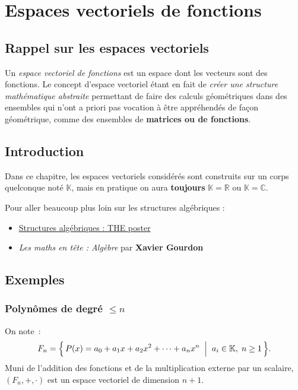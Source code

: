 \chapter{Espaces vectoriels de fonctions} \label{chap:evf}

\section{Rappel sur les espaces vectoriels}
Un \emph{espace vectoriel de fonctions} est un espace dont les
vecteurs sont des fonctions. Le concept d'espace vectoriel étant en
fait de \emph{créer une structure mathématique abstraite} permettant de
faire des calculs géométriques dans des ensembles qui n'ont a priori
pas vocation à être appréhendés de façon géométrique, comme des
ensembles de \textbf{matrices ou de fonctions}.

\section{Introduction}
Dans ce chapitre, les espaces vectoriels considérés sont construits
sur un corps quelconque not\'e $\mathbb{K}$, mais en pratique on aura
\textbf{toujours} $\mathbb{K}=\mathbb{R}$ ou $\mathbb{K}=\mathbb{C}$.

\begin{Note}
	Pour aller beaucoup plus loin sur les structures alg\'ebriques :
	\begin{itemize}
		\item \href{https://rancune.org/sciences/2022/03/23/structures-algebriques.html}{Structures algébriques : THE poster}
		\item \emph{Les maths en tête : Algèbre} par \textbf{Xavier Gourdon}\Cite{Gourdon2009}
	\end{itemize}
\end{Note}

\section{Exemples}

\subsection{Polynômes de degré $\leq n$}
On note~:
\[
  F_n = \Bigl\{\, P(x) = a_0 + a_1 x + a_2 x^2 + \cdots + a_n x^n
  \;\Bigm|\; a_i \in \mathbb{K},\; n \geq 1 \,\Bigr\}.
\]
Muni de l’addition des fonctions et de la multiplication externe par
un scalaire,
$(F_n,+,\cdot)$ est un espace vectoriel de dimension $n+1$.

